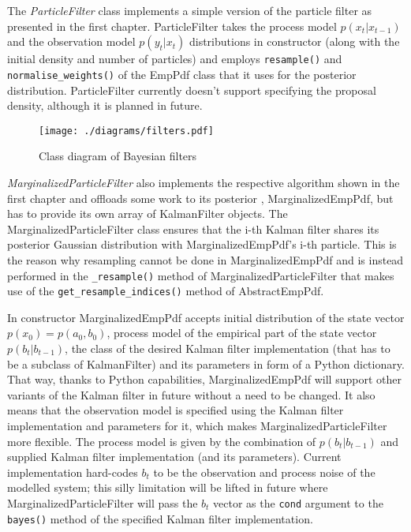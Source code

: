 The \emph{ParticleFilter} class implements a simple version of the particle filter as presented in
the first chapter. ParticleFilter takes the process model \(p(x_t|x_{t-1})\) and the observation
model \(p(y_t|x_t)\) distributions in constructor (along with the initial density and number of
particles) and employs \verb|resample()| and \verb|normalise_weights()| of the EmpPdf class that it
uses for the posterior distribution. ParticleFilter currently doesn't support specifying the
proposal density, although it is planned in future.

\begin{figure}[h!]
	\centering
	\texttt{[image: ./diagrams/filters.pdf]}
	\vspace{-8mm}
	\caption{Class diagram of Bayesian filters}
	\label{fig:DiaFilters}
\end{figure}

\emph{MarginalizedParticleFilter} also implements the respective algorithm shown in the first
chapter and offloads some work to its posterior {\pdf}, MarginalizedEmpPdf, but has to provide its
own array of KalmanFilter objects. The MarginalizedParticleFilter class ensures that the i-th Kalman
filter shares its posterior Gaussian distribution with MarginalizedEmpPdf's i-th particle. This is
the reason why resampling cannot be done in MarginalizedEmpPdf and is instead performed in the
\verb|_resample()| method of MarginalizedParticleFilter that makes use of the
\verb|get_resample_indices()| method of AbstractEmpPdf.

In constructor MarginalizedEmpPdf accepts initial distribution of the state vector
\(p(x_0) = p(a_0, b_0)\), process model of the empirical part of the state vector \(p(b_t|b_{t-1})\),
the class of the desired Kalman filter implementation (that has to be a subclass of KalmanFilter)
and its parameters in form of a Python dictionary. That way, thanks to Python capabilities,
MarginalizedEmpPdf will support other variants of the Kalman filter in future without a need to be
changed. It also means that the observation model is specified using the Kalman filter implementation
and parameters for it, which makes MarginalizedParticleFilter more flexible. The process model is
given by the combination of \(p(b_t|b_{t-1})\) and supplied Kalman filter implementation (and its
parameters). Current implementation hard-codes \(b_t\) to be the observation and process noise of
the modelled system; this silly limitation will be lifted in future where MarginalizedParticleFilter
will pass the \(b_t\) vector as the \verb|cond| argument to the \verb|bayes()| method of the
specified Kalman filter implementation.

